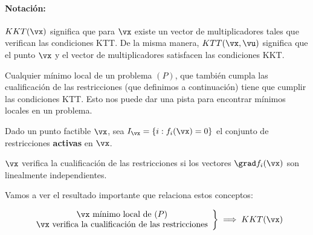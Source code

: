 \paragraph{Notación:} $KKT(\vx)$ significa que para $\vx$ existe un vector de multiplicadores tales que verifican las condiciones KTT.
%
De la misma manera, $KTT(\vx,\vu)$ significa que el punto $\vx$ y el vector de multiplicadores satisfacen las condiciones KKT.

Cualquier mínimo local de un problema $(P)$, que también cumpla las cualificación de las restricciones (que definimos a continuación) tiene que cumplir las condiciones KTT. 
Esto nos puede dar una pista para encontrar mínimos locales en un problema.


\begin{defn}
Dado un punto factible $\vx$, sea $I_{\vx} = \{i : f_i(\vx) = 0\}$ el conjunto de restricciones \textbf{activas} en $\vx$.

$\vx$ verifica la cualificación de las restricciones si los vectores $\grad f_i(\vx)$ son linealmente independientes.
\end{defn}

Vamos a ver el resultado importante que relaciona estos conceptos:

\begin{theorem}
\label{thm:cualificacionYKKT}
\[
\left.
	\begin{array}{c}
		\vx \text{ mínimo local de } (P)\\
		\vx \text{ verifica la cualificación de las restricciones}
	\end{array}
\right\} \implies KKT(\vx)
\]
\end{theorem}

